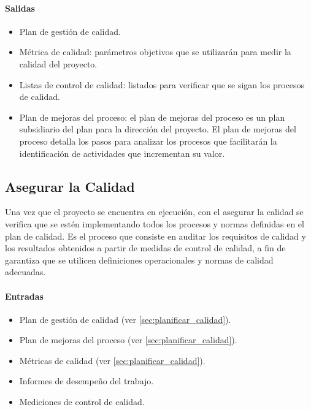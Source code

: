 \documentclass[a4paper,twosides]{article}
\newlength{\wideitemsep}
\let\olditem\item
\renewcommand{\item}{\setlength{\itemsep}{\wideitemsep}\olditem}
\begin{document}
\paragraph{Salidas}
\begin{itemize}
\item Plan de gestión de calidad.
\item Métrica de calidad: parámetros objetivos que se utilizarán para medir la calidad del proyecto.
\item Listas de control de calidad: listados para verificar que se sigan los procesos de calidad.
\item Plan de mejoras del proceso: el plan de mejoras del proceso es un plan subsidiario del plan para la dirección del proyecto. El plan de mejoras del proceso detalla los pasos para analizar los procesos que facilitarán la identificación de actividades que incrementan su valor.

\end{itemize}

\subsection{Asegurar la Calidad} \label{sec:asegurar_calidad}
Una vez que el proyecto se encuentra en ejecución, con el asegurar la calidad se verifica que se estén implementando todos los procesos y normas definidas en el plan de calidad. Es el proceso que consiste en auditar los requisitos de calidad y los resultados obtenidos a partir de medidas de control de calidad, a fin de garantiza que se utilicen definiciones operacionales y normas de calidad adecuadas.

\paragraph{Entradas}
\begin{itemize}
\item Plan de gestión de calidad (ver \ref{sec:planificar_calidad}).
\item Plan de mejoras del proceso (ver \ref{sec:planificar_calidad}).
\item Métricas de calidad (ver \ref{sec:planificar_calidad}).
\item Informes de desempeño del trabajo.
\item Mediciones de control de calidad.
\end{itemize}
\end{document}
